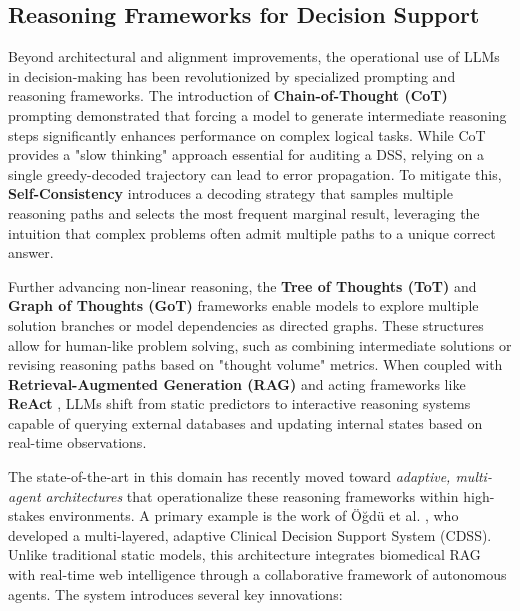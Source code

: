 \subsection{Reasoning Frameworks for Decision Support}
Beyond architectural and alignment improvements, the operational use of LLMs in decision-making has been revolutionized by specialized prompting and reasoning frameworks. The introduction of \textbf{Chain-of-Thought (CoT)} prompting \cite{wei2022chain} demonstrated that forcing a model to generate intermediate reasoning steps significantly enhances performance on complex logical tasks. While CoT provides a "slow thinking" approach essential for auditing a DSS, relying on a single greedy-decoded trajectory can lead to error propagation. To mitigate this, \textbf{Self-Consistency} \cite{wang2022self} introduces a decoding strategy that samples multiple reasoning paths and selects the most frequent marginal result, leveraging the intuition that complex problems often admit multiple paths to a unique correct answer.

Further advancing non-linear reasoning, the \textbf{Tree of Thoughts (ToT)} \cite{yao2023tree} and \textbf{Graph of Thoughts (GoT)} \cite{besta2024graph} frameworks enable models to explore multiple solution branches or model dependencies as directed graphs. These structures allow for human-like problem solving, such as combining intermediate solutions or revising reasoning paths based on "thought volume" metrics. When coupled with \textbf{Retrieval-Augmented Generation (RAG)} \cite{lewis2020retrieval} and acting frameworks like \textbf{ReAct} \cite{yao2022react}, LLMs shift from static predictors to interactive reasoning systems capable of querying external databases and updating internal states based on real-time observations.

The state-of-the-art in this domain has recently moved toward \textit{adaptive, multi-agent architectures} that operationalize these reasoning frameworks within high-stakes environments. A primary example is the work of Öğdü et al. \cite{ougdu2025adaptive}, who developed a multi-layered, adaptive Clinical Decision Support System (CDSS). Unlike traditional static models, this architecture integrates biomedical RAG with real-time web intelligence through a collaborative framework of autonomous agents. The system introduces several key innovations:

